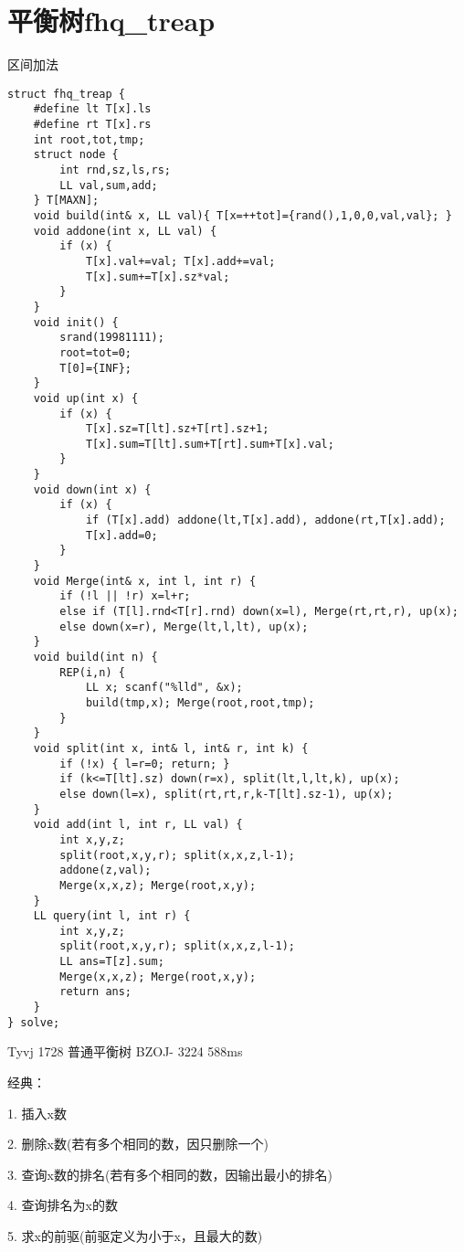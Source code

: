 \section{平衡树fhq\_treap}

区间加法

\begin{lstlisting}
struct fhq_treap {
    #define lt T[x].ls
    #define rt T[x].rs
    int root,tot,tmp;
    struct node {
        int rnd,sz,ls,rs;
        LL val,sum,add;
    } T[MAXN];
    void build(int& x, LL val){ T[x=++tot]={rand(),1,0,0,val,val}; }
    void addone(int x, LL val) {
        if (x) {
            T[x].val+=val; T[x].add+=val;
            T[x].sum+=T[x].sz*val;
        }
    }
    void init() {
        srand(19981111);
        root=tot=0;
        T[0]={INF};
    }
    void up(int x) {
        if (x) {
            T[x].sz=T[lt].sz+T[rt].sz+1;
            T[x].sum=T[lt].sum+T[rt].sum+T[x].val;
        }
    }
    void down(int x) {
        if (x) {
            if (T[x].add) addone(lt,T[x].add), addone(rt,T[x].add);
            T[x].add=0;
        }
    }
    void Merge(int& x, int l, int r) {
        if (!l || !r) x=l+r;
        else if (T[l].rnd<T[r].rnd) down(x=l), Merge(rt,rt,r), up(x);
        else down(x=r), Merge(lt,l,lt), up(x);
    }
    void build(int n) {
        REP(i,n) {
            LL x; scanf("%lld", &x);
            build(tmp,x); Merge(root,root,tmp);
        }
    }
    void split(int x, int& l, int& r, int k) {
        if (!x) { l=r=0; return; }
        if (k<=T[lt].sz) down(r=x), split(lt,l,lt,k), up(x);
        else down(l=x), split(rt,rt,r,k-T[lt].sz-1), up(x);
    }
    void add(int l, int r, LL val) {
        int x,y,z;
        split(root,x,y,r); split(x,x,z,l-1);
        addone(z,val);
        Merge(x,x,z); Merge(root,x,y);
    }
    LL query(int l, int r) {
        int x,y,z;
        split(root,x,y,r); split(x,x,z,l-1);
        LL ans=T[z].sum;
        Merge(x,x,z); Merge(root,x,y);
        return ans;
    }
} solve;
\end{lstlisting}

Tyvj 1728 普通平衡树 BZOJ- 3224 588ms

经典：

1. 插入x数

2. 删除x数(若有多个相同的数，因只删除一个)

3. 查询x数的排名(若有多个相同的数，因输出最小的排名)

4. 查询排名为x的数

5. 求x的前驱(前驱定义为小于x，且最大的数)

